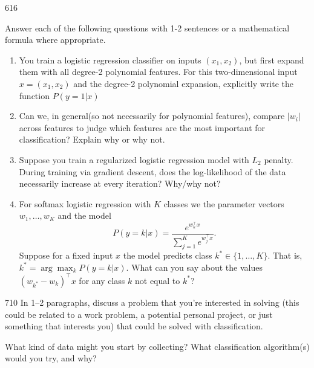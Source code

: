 \documentclass[11pt]{article}
\begin{document}
\begin{problem}{6}{16}

Answer each of the following questions with 1-2 sentences or a mathematical formula where appropriate.

\begin{enumerate}

\item[(a)] You train a logistic regression classifier on inputs $(x_1, x_2)$, 
but first expand them with all degree-2 polynomial features. For this two-dimensional input $x = (x_1, x_2)$ and the degree-2 polynomial expansion, explicitly write the function $P(y=1|x)$

\item[(b)] Can we, in general(so not necessarily for polynomial features), compare $|w_i|$ across features to judge which features are the most important for classification? Explain why or why not.

\item[(c)] Suppose you train a regularized logistic regression model with $L_2$ penalty.
During training via gradient descent, does the log-likelihood of the data necessarily increase at every iteration? Why/why not?

\item[(d)] For softmax logistic regression with $K$ classes we the parameter vectors $w_1,\dots,w_K$ and the model
\[
P(y=k | x)= \frac{e^{w_k^\top x}}{\sum_{j=1}^K e^{w_j^\top x}}.
\]
Suppose for a fixed input $x$ the model predicts class $k^* \in \{1, \dots, K \}$. That is, $k^* = \arg\max_k P(y=k | x)$. What can you say about the values $(w_{k^*}-w_k)^\top x$ for any class $k$ not equal to $k^*$?

\end{enumerate}
\end{problem}

\begin{studentanswer}[30]
\end{studentanswer}
\newpage



\begin{problem}{7}{10}
In 1–2 paragraphs, discuss a problem that you’re interested in solving (this could be related to a work problem, a potential personal project, or just something that interests you) that could be solved with classification. 

What kind of data might you start by collecting? What classification algorithm(s) would you try, and why?
\end{problem}
\end{document}
